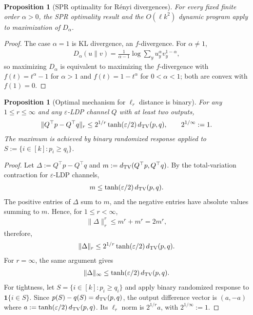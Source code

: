 \documentclass{article}
\theoremstyle{plain}
\newtheorem{proposition}[theorem]{Proposition}
\theoremstyle{definition}
\theoremstyle{plain}
\newcommand{\eps}{\varepsilon}
\begin{document}
\begin{proposition}[SPR optimality for R\'enyi divergences]
\label{prop:renyi_divergence_optimality}
For every fixed finite order $\alpha>0$, the SPR optimality result and the $O(\ell k^2)$ dynamic program apply to maximization of $D_\alpha$.
\end{proposition}

\begin{proof}
The case $\alpha=1$ is KL divergence, an $f$-divergence. For $\alpha\neq 1$,
\begin{align}
    D_\alpha(u\|v) = \frac{1}{\alpha-1}\log\sum_y u_y^\alpha v_y^{1-\alpha},
\end{align}
so maximizing $D_\alpha$ is equivalent to maximizing the $f$-divergence with $f(t)=t^\alpha-1$ for $\alpha>1$ and $f(t)=1-t^\alpha$ for $0<\alpha<1$; both are convex with $f(1)=0$.
\end{proof}

\begin{proposition}[Optimal mechanism for $\ell_r$ distance is binary]
\label{prop:optimality_l_p}
For any $1\le r\le\infty$ and any $\eps$-LDP channel $Q$ with at least two outputs,
\begin{align}
    \|Q^\top p-Q^\top q\|_r \le 2^{1/r}\tanh(\eps/2)\,d_{\rm TV}(p,q), \qquad 2^{1/\infty}:=1.
\end{align}
The maximum is achieved by binary randomized response applied to $S:=\{i\in[k]:p_i\ge q_i\}$.
\end{proposition}

\begin{proof}
Let $\Delta := Q^\top p-Q^\top q$ and $m:=d_{\rm TV}(Q^\top p,Q^\top q)$. By the total-variation contraction for $\eps$-LDP channels,
\begin{align}
    m\le \tanh(\eps/2)\,d_{\rm TV}(p,q).
\end{align}
The positive entries of $\Delta$ sum to $m$, and the negative entries have absolute values summing to $m$. Hence, for $1\le r<\infty$,
\begin{align}
    \|\Delta\|_r^r\le m^r+m^r=2m^r,
\end{align}
therefore,
\begin{align}
    \|\Delta\|_r
    \le 2^{1/r}\tanh(\eps/2)\,d_{\rm TV}(p,q).
\end{align}
For $r=\infty$, the same argument gives
\begin{align}
    \|\Delta\|_\infty
    \le \tanh(\eps/2)\,d_{\rm TV}(p,q).
\end{align}
For tightness, let $S=\{i\in[k]:p_i\ge q_i\}$ and apply binary randomized response to $\mathbf 1\{i\in S\}$. Since $p(S)-q(S)=d_{\rm TV}(p,q)$, the output difference vector is $(a,-a)$ where $a:=\tanh(\eps/2)\,d_{\rm TV}(p,q)$. Its $\ell_r$ norm is $2^{1/r}a$, with $2^{1/\infty}:=1$.
\end{proof}
\end{document}
